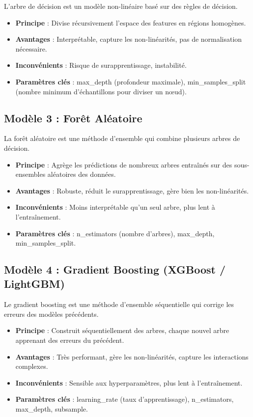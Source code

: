 L'arbre de décision est un modèle non-linéaire basé sur des règles de décision.

\begin{itemize}
    \item \textbf{Principe} : Divise récursivement l'espace des features en régions homogènes.
    \item \textbf{Avantages} : Interprétable, capture les non-linéarités, pas de normalisation nécessaire.
    \item \textbf{Inconvénients} : Risque de surapprentissage, instabilité.
    \item \textbf{Paramètres clés} : max\_depth (profondeur maximale), min\_samples\_split (nombre minimum d'échantillons pour diviser un nœud).
\end{itemize}

\subsection{Modèle 3 : Forêt Aléatoire}
\label{subsec:random-forest}

La forêt aléatoire est une méthode d'ensemble qui combine plusieurs arbres de décision.

\begin{itemize}
    \item \textbf{Principe} : Agrège les prédictions de nombreux arbres entraînés sur des sous-ensembles aléatoires des données.
    \item \textbf{Avantages} : Robuste, réduit le surapprentissage, gère bien les non-linéarités.
    \item \textbf{Inconvénients} : Moins interprétable qu'un seul arbre, plus lent à l'entraînement.
    \item \textbf{Paramètres clés} : n\_estimators (nombre d'arbres), max\_depth, min\_samples\_split.
\end{itemize}

\subsection{Modèle 4 : Gradient Boosting (XGBoost / LightGBM)}
\label{subsec:gradient-boosting}

Le gradient boosting est une méthode d'ensemble séquentielle qui corrige les erreurs des modèles précédents.

\begin{itemize}
    \item \textbf{Principe} : Construit séquentiellement des arbres, chaque nouvel arbre apprenant des erreurs du précédent.
    \item \textbf{Avantages} : Très performant, gère les non-linéarités, capture les interactions complexes.
    \item \textbf{Inconvénients} : Sensible aux hyperparamètres, plus lent à l'entraînement.
    \item \textbf{Paramètres clés} : learning\_rate (taux d'apprentissage), n\_estimators, max\_depth, subsample.
\end{itemize}

